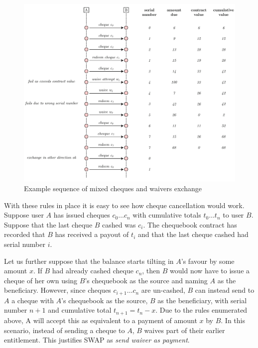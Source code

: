 \begin{figure}[htbp]
\centering
\includegraphics[width=\textwidth]{fig/waivers-diagram-2.pdf}
\caption[Example sequence of mixed cheques and waivers exchange \statusgreen]{Example sequence of mixed cheques and waivers exchange}
\label{fig:waivers-diagram}
\end{figure}

With these rules in place it is easy to see how cheque cancellation would work. Suppose user $A$ has issued cheques $c_0 \ldots c_n$ with cumulative totals $t_0 \ldots t_n$ to user $B$. Suppose that the last cheque $B$ cashed was $c_i$. The chequebook contract has recorded that $B$ has received a payout of $t_i$ and that the last cheque cashed had serial number $i$.

Let us further suppose that the balance starts tilting in $A$'s favour by some amount $x$. If $B$ had already cashed cheque $c_n$, then $B$ would now have to issue a cheque of her own using $B$'s chequebook as the source and naming $A$ as the beneficiary. However, since cheques $c_{i+1} \ldots c_n$  are un-cashed, $B$ can instead send to $A$ a cheque with $A$'s chequebook as the source, $B$ as the beneficiary, with serial number $n+1$ and cumulative total $t_{n+1} = t_n - x$. Due to the rules enumerated above, A will accept this as equivalent to a payment of amount $x$ by $B$.  In this scenario, instead of sending a cheque to $A$, $B$ waives part of their earlier entitlement. This justifies SWAP as \emph{send waiver as payment}.

